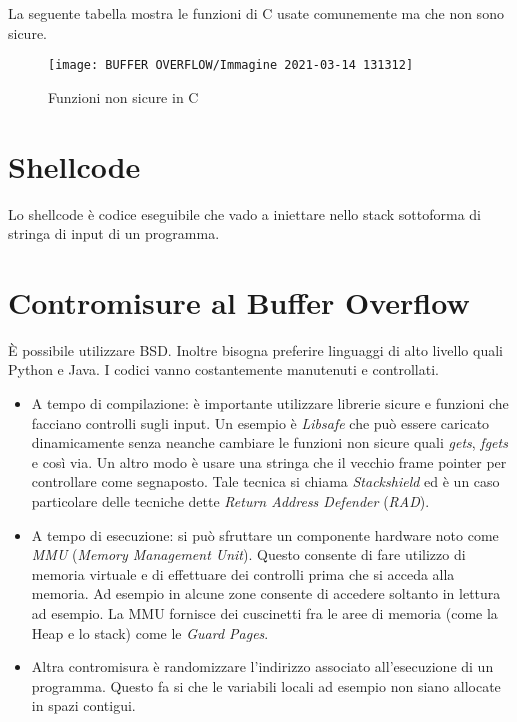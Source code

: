 \documentclass[14pt]{extreport}
\begin{document}
La seguente tabella mostra le funzioni di C usate comunemente ma che non sono sicure.



\begin{figure}[H]
    \centering
    \texttt{[image: BUFFER OVERFLOW/Immagine 2021-03-14 131312]}
    \caption{Funzioni non sicure in C}
\end{figure}


\section{Shellcode}
Lo shellcode è codice eseguibile che vado a iniettare nello stack sottoforma di stringa di input di un programma.



\section{Contromisure al Buffer Overflow}
È possibile utilizzare BSD. Inoltre bisogna preferire linguaggi di alto livello quali Python e Java. I codici vanno costantemente manutenuti e controllati.

\begin{itemize}
    \item A tempo di compilazione: è importante utilizzare librerie sicure e funzioni che facciano controlli sugli input. Un esempio è \textit{Libsafe} che può essere caricato dinamicamente senza neanche cambiare le funzioni non sicure quali \textit{gets}, \textit{fgets} e così via.
Un altro modo è usare una stringa che  il vecchio frame pointer per controllare come segnaposto. Tale tecnica si chiama \textit{Stackshield} ed è un caso particolare delle tecniche dette \textit{Return Address Defender} (\textit{RAD}).

    \item A tempo di esecuzione: si può sfruttare un componente hardware noto come \textit{MMU} (\textit{Memory Management Unit}). Questo consente di fare utilizzo di memoria virtuale e di effettuare dei controlli prima che si acceda alla memoria. Ad esempio in alcune zone consente di accedere soltanto in lettura ad esempio. La MMU fornisce dei cuscinetti fra le aree di memoria (come la Heap e lo stack) come le \textit{Guard Pages}.
    
    
    \item Altra contromisura è randomizzare l'indirizzo associato all'esecuzione di un programma. Questo fa si che le variabili locali ad esempio non siano allocate in spazi contigui.
    
    
\end{itemize}
\end{document}
